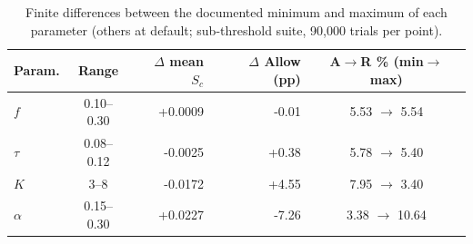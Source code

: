 \begin{table}[!t]
\caption{Finite differences between the documented minimum and maximum of each parameter (others at default;
sub-threshold suite, 90,000 trials per point).}
\label{tab:finite-differences}
\centering\footnotesize
\begin{tabular}{@{}lcrrc@{}}
\toprule
\textbf{Param.} & \textbf{Range} & \textbf{$\Delta$ mean $S_c$} & \textbf{$\Delta$ Allow (pp)} & \textbf{A$\to$R \% (min$\to$max)} \\
\midrule
$f$ & 0.10--0.30 & +0.0009 & -0.01 & 5.53 $\to$ 5.54 \\
$\tau$ & 0.08--0.12 & -0.0025 & +0.38 & 5.78 $\to$ 5.40 \\
$K$ & 3--8 & -0.0172 & +4.55 & 7.95 $\to$ 3.40 \\
$\alpha$ & 0.15--0.30 & +0.0227 & -7.26 & 3.38 $\to$ 10.64 \\
\bottomrule
\end{tabular}
\end{table}

